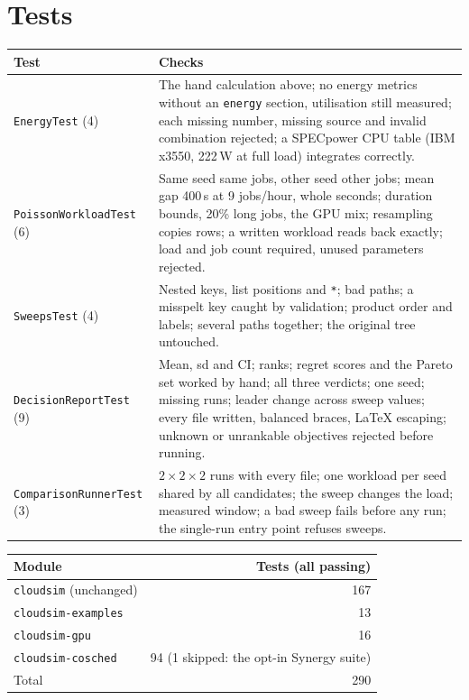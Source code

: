 \documentclass[11pt,a4paper]{article}
\newcommand{\code}[1]{\texttt{#1}}
\begin{document}
\section{Tests}

\begin{center}
\begin{tabularx}{\linewidth}{@{}lX@{}}
\toprule
Test & Checks \\
\midrule
\code{EnergyTest} (4) & The hand calculation above; no energy metrics without an \code{energy} section, utilisation
  still measured; each missing number, missing source and invalid combination rejected; a SPECpower CPU table
  (IBM x3550, 222\,W at full load) integrates correctly. \\
\code{PoissonWorkloadTest} (6) & Same seed same jobs, other seed other jobs; mean gap 400\,s at 9 jobs/hour, whole
  seconds; duration bounds, 20\% long jobs, the GPU mix; resampling copies rows; a written workload reads back
  exactly; load and job count required, unused parameters rejected. \\
\code{SweepsTest} (4) & Nested keys, list positions and \code{*}; bad paths; a misspelt key caught by validation;
  product order and labels; several paths together; the original tree untouched. \\
\code{DecisionReportTest} (9) & Mean, sd and CI; ranks; regret scores and the Pareto set worked by hand; all
  three verdicts; one seed; missing runs; leader change across sweep values; every file written, balanced braces,
  LaTeX escaping; unknown or unrankable objectives rejected before running. \\
\code{ComparisonRunnerTest} (3) & $2 \times 2 \times 2$ runs with every file; one workload per seed shared by all
  candidates; the sweep changes the load; measured window; a bad sweep fails before any run; the single-run entry
  point refuses sweeps. \\
\bottomrule
\end{tabularx}
\end{center}

\begin{center}
\begin{tabular}{@{}lr@{}}
\toprule
Module & Tests (all passing) \\
\midrule
\code{cloudsim} (unchanged) & 167 \\
\code{cloudsim-examples} & 13 \\
\code{cloudsim-gpu} & 16 \\
\code{cloudsim-cosched} & 94 (1 skipped: the opt-in Synergy suite) \\
\midrule
Total & 290 \\
\bottomrule
\end{tabular}
\end{center}
\end{document}
